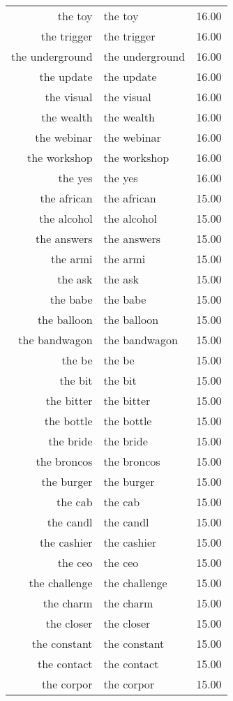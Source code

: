 \begin{table}[ht]
\begin{tabular}{rlr}
  the toy & the toy & 16.00 \\ 
  the trigger & the trigger & 16.00 \\ 
  the underground & the underground & 16.00 \\ 
  the update & the update & 16.00 \\ 
  the visual & the visual & 16.00 \\ 
  the wealth & the wealth & 16.00 \\ 
  the webinar & the webinar & 16.00 \\ 
  the workshop & the workshop & 16.00 \\ 
  the yes & the yes & 16.00 \\ 
  the african & the african & 15.00 \\ 
  the alcohol & the alcohol & 15.00 \\ 
  the answers & the answers & 15.00 \\ 
  the armi & the armi & 15.00 \\ 
  the ask & the ask & 15.00 \\ 
  the babe & the babe & 15.00 \\ 
  the balloon & the balloon & 15.00 \\ 
  the bandwagon & the bandwagon & 15.00 \\ 
  the be & the be & 15.00 \\ 
  the bit & the bit & 15.00 \\ 
  the bitter & the bitter & 15.00 \\ 
  the bottle & the bottle & 15.00 \\ 
  the bride & the bride & 15.00 \\ 
  the broncos & the broncos & 15.00 \\ 
  the burger & the burger & 15.00 \\ 
  the cab & the cab & 15.00 \\ 
  the candl & the candl & 15.00 \\ 
  the cashier & the cashier & 15.00 \\ 
  the ceo & the ceo & 15.00 \\ 
  the challenge & the challenge & 15.00 \\ 
  the charm & the charm & 15.00 \\ 
  the closer & the closer & 15.00 \\ 
  the constant & the constant & 15.00 \\ 
  the contact & the contact & 15.00 \\ 
  the corpor & the corpor & 15.00 \\ 

\end{tabular}
\end{table}
